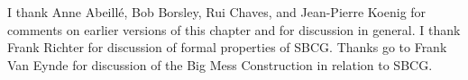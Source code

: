 \documentclass[output=paper,biblatex,babelshorthands,newtxmath,draftmode,colorlinks,citecolor=brown]{langscibook}
\begin{document}
\section*{\acknowledgmentsUS}

I thank Anne Abeillé, Bob Borsley, Rui Chaves, and Jean-Pierre Koenig for comments on earlier
versions of this chapter and for discussion in general. I thank Frank Richter for discussion of
formal properties of SBCG. Thanks go to Frank Van Eynde for discussion of the Big Mess Construction
in relation to SBCG.


{\sloppy
\printbibliography[heading=subbibliography,notkeyword=this]
}
\end{document}

